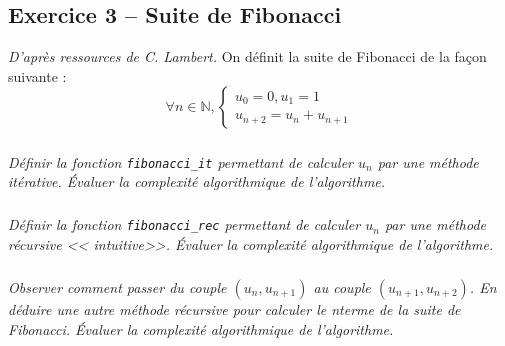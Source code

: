 \else
\fi
 
\subsection*{Exercice 3 -- Suite de Fibonacci}
\setcounter{exo}{0}

\ifprof
\else
\textit{D'après ressources de C. Lambert.}
On définit la suite de Fibonacci de la façon suivante : 
$$
\forall n\in \mathbb{N}, \left\{ \begin{array}{l}
u_0 = 0, u_1 = 1 \\
u_{n+2} = u_{n} + u_{n+1}
\end{array}\right.
$$
\subparagraph{}
\textit{Définir la fonction \texttt{fibonacci\_it} permettant de calculer $u_n$ par une méthode itérative. Évaluer la 
complexité algorithmique de l'algorithme.}

\subparagraph{}
\textit{Définir la fonction \texttt{fibonacci\_rec} permettant de calculer $u_n$ par une méthode récursive << 
intuitive>>. Évaluer la complexité algorithmique de l'algorithme.}


\subparagraph{}
\textit{Observer comment passer du couple $(u_n,u_{n+1})$ au couple $(u_{n+1},u_{n+2})$. En déduire une autre méthode 
récursive pour calculer le n\ieme terme de la suite de Fibonacci. Évaluer la complexité algorithmique de l'algorithme.}
\fi


